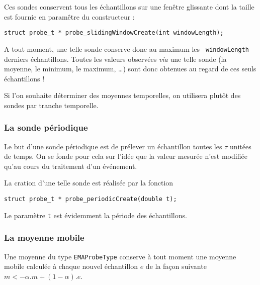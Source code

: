    Ces sondes conservent tous les échantillons sur une fenêtre
glissante dont la taille est fournie en paramêtre du constructeur :

\begin{verbatim}
struct probe_t * probe_slidingWindowCreate(int windowLength);
\end{verbatim}

   A tout moment, une telle sonde conserve donc au maximum les {\tt
windowLength} derniers échantillons. Toutes les valeurs observées
{\em via} une telle sonde (la moyenne, le minimum, le maximum, \ldots)
sont donc obtenues au regard de ces seuls échantillons !

   Si l'on souhaite déterminer des moyennes temporelles, on utilisera
plutôt des sondes par tranche temporelle.

%
\subsubsection{La sonde périodique}

   Le but d'une sonde périodique est de prélever un échantillon toutes
les $\tau$ unitées de temps. On se fonde pour cela sur l'idée que la
valeur mesurée n'est modifiée qu'au cours du traitement d'un
événement.

   La cration d'une telle sonde est réalisée par la fonction 

\begin{verbatim}
struct probe_t * probe_periodicCreate(double t);
\end{verbatim}

   Le paramètre {\tt t} est évidemment la période des échantillons.

%
\subsubsection{La moyenne mobile}

   Une moyenne du type \lstinline!EMAProbeType! conserve à tout moment
une moyenne mobile calculée à chaque nouvel échantillon $e$ de la façon
suivante $m <- \alpha . m + (1 - \alpha).e$.

%
